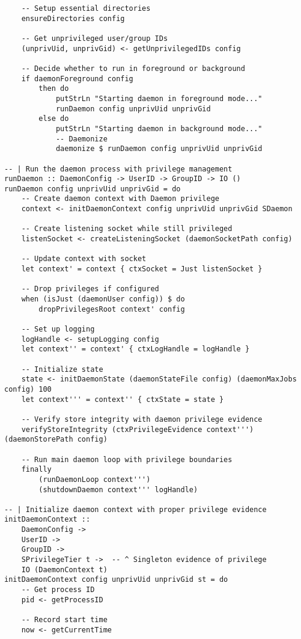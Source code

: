 \documentclass{article}
\begin{document}
\begin{tcolorbox}[title=Ten/Daemon/Core.hs Changes]
\begin{verbatim}
    -- Setup essential directories
    ensureDirectories config

    -- Get unprivileged user/group IDs
    (unprivUid, unprivGid) <- getUnprivilegedIDs config

    -- Decide whether to run in foreground or background
    if daemonForeground config
        then do
            putStrLn "Starting daemon in foreground mode..."
            runDaemon config unprivUid unprivGid
        else do
            putStrLn "Starting daemon in background mode..."
            -- Daemonize
            daemonize $ runDaemon config unprivUid unprivGid

-- | Run the daemon process with privilege management
runDaemon :: DaemonConfig -> UserID -> GroupID -> IO ()
runDaemon config unprivUid unprivGid = do
    -- Create daemon context with Daemon privilege
    context <- initDaemonContext config unprivUid unprivGid SDaemon

    -- Create listening socket while still privileged
    listenSocket <- createListeningSocket (daemonSocketPath config)

    -- Update context with socket
    let context' = context { ctxSocket = Just listenSocket }

    -- Drop privileges if configured
    when (isJust (daemonUser config)) $ do
        dropPrivilegesRoot context' config

    -- Set up logging
    logHandle <- setupLogging config
    let context'' = context' { ctxLogHandle = logHandle }

    -- Initialize state
    state <- initDaemonState (daemonStateFile config) (daemonMaxJobs config) 100
    let context''' = context'' { ctxState = state }

    -- Verify store integrity with daemon privilege evidence
    verifyStoreIntegrity (ctxPrivilegeEvidence context''') (daemonStorePath config)

    -- Run main daemon loop with privilege boundaries
    finally
        (runDaemonLoop context''')
        (shutdownDaemon context''' logHandle)

-- | Initialize daemon context with proper privilege evidence
initDaemonContext ::
    DaemonConfig ->
    UserID ->
    GroupID ->
    SPrivilegeTier t ->  -- ^ Singleton evidence of privilege
    IO (DaemonContext t)
initDaemonContext config unprivUid unprivGid st = do
    -- Get process ID
    pid <- getProcessID

    -- Record start time
    now <- getCurrentTime


\end{verbatim}
\end{tcolorbox}
\end{document}
